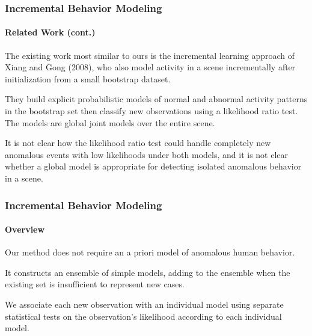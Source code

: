 \begin{frame}
    \frametitle{Incremental Behavior Modeling}
    \framesubtitle{Related Work (cont.)}

    The existing work most similar to ours is the incremental 
    learning approach of Xiang and Gong (2008), who also model 
    activity in a scene incrementally after initialization from 
    a small bootstrap dataset. 
    
    \bigskip
    
    They build explicit probabilistic models of normal and abnormal 
    activity patterns in the bootstrap set then classify new observations 
    using a likelihood ratio test. The models are global joint
    models over the entire scene. 
    
    \bigskip
    
    It is not clear how the likelihood ratio test could handle completely new
    anomalous events with low likelihoods under both models, and it 
    is not clear whether a global model is appropriate for detecting isolated 
    anomalous behavior in a scene.

\end{frame}


\begin{frame}
    \frametitle{Incremental Behavior Modeling}
    \framesubtitle{Overview}

    Our method does not require an a priori model of anomalous 
    human behavior. 

    \bigskip
    
    It constructs an ensemble of simple models, adding to the 
    ensemble when the existing set is insufficient to represent 
    new cases. 

    \bigskip
    
    We associate each new observation with an individual 
    model using separate statistical tests on the observation's 
    likelihood according to each individual model. 
    
\end{frame}


